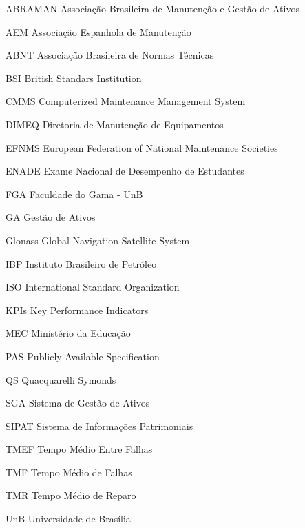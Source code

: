 \begin{siglas}
  \item[ABRAMAN] Associação Brasileira de Manutenção e Gestão de Ativos
  \item[AEM] Associação Espanhola de Manutenção
  \item[ABNT] Associação Brasileira de Normas Técnicas
  \item[BSI] British Standars Institution
  \item[CMMS] Computerized Maintenance Management System
  \item[DIMEQ] Diretoria de Manutenção de Equipamentos
  \item[EFNMS] European Federation of National Maintenance Societies 
  \item[ENADE] Exame Nacional de Desempenho de Estudantes
  \item[FGA] Faculdade do Gama - UnB
  \item[GA] Gestão de Ativos
  \item[Glonass] Global Navigation Satellite System
  \item[IBP] Instituto Brasileiro de Petróleo
  \item[ISO] International Standard Organization
  \item[KPIs] Key Performance Indicators
  \item[MEC] Ministério da Educação
  \item[PAS] Publicly Available Specification
  \item[QS] Quacquarelli Symonds
  \item[SGA] Sistema de Gestão de Ativos
  \item[SIPAT] Sistema de Informações Patrimoniais
  \item[TMEF] Tempo Médio Entre Falhas 
  \item[TMF] Tempo Médio de Falhas
  \item[TMR] Tempo Médio de Reparo  
  \item[UnB] Universidade de Brasília
\end{siglas}